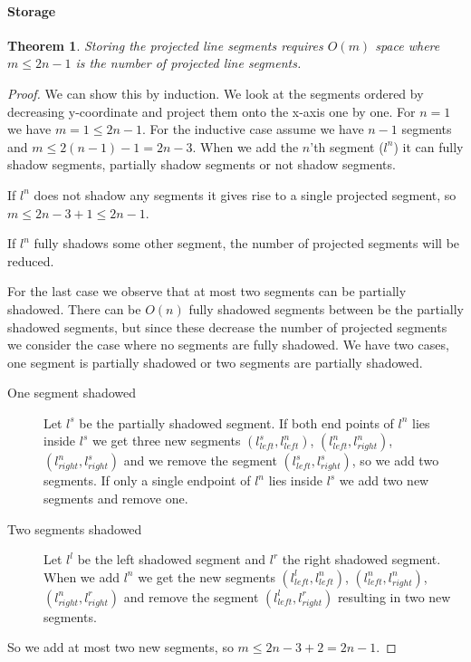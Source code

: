 \documentclass[10pt,a4paper,final,oneside,openany,article,oldfontcommands]{memoir}
\newtheorem{rayshooting}{Theorem}
\begin{document}
\paragraph{Storage}
\begin{rayshooting}
  Storing the projected line segments requires $O(m)$ space where $m \le 2n-1$ is the number of projected line segments.
\end{rayshooting}
\begin{proof}
We can show this by induction. We look at the segments ordered by decreasing y-coordinate and project them onto the x-axis one by one. For $n = 1$ we have $m = 1 \le 2n -1$. For the inductive case assume we have $n-1$ segments and $m \le 2(n-1) - 1 = 2n - 3$. When we add the $n$'th segment ($l^n$) it can fully shadow segments, partially shadow segments or not shadow segments.

If $l^n$ does not shadow any segments it gives rise to a single projected segment, so $m \le 2n - 3 + 1 \le 2n - 1$.

If $l^n$ fully shadows some other segment, the number of projected segments will be reduced.

For the last case we observe that at most two segments can be partially shadowed. There can be $O(n)$ fully shadowed segments between be the partially shadowed segments, but since these decrease the number of projected segments we consider the case where no segments are fully shadowed. We have two cases, one segment is partially shadowed or two segments are partially shadowed. 

\begin{description}
\item[One segment shadowed] Let $l^s$ be the partially shadowed segment. If both end points of $l^n$ lies inside $l^s$ we get three new segments $(l^s_{left},l^n_{left})$, $(l^n_{left}, l^n_{right})$, $(l^n_{right}, l^s_{right})$ and we remove the segment $(l^s_{left}, l^s_{right})$, so we add two segments. If only a single endpoint of $l^n$ lies inside $l^s$ we add two new segments and remove one.
\item[Two segments shadowed] Let $l^l$ be the left shadowed segment and $l^r$ the right shadowed segment. When we add $l^n$ we get the new segments $(l^l_{left},l^n_{left})$, $(l^n_{left}, l^n_{right})$, $(l^n_{right}, l^r_{right})$ and remove the segment $(l^l_{left}, l^r_{right})$ resulting in two new segments.
\end{description}
So we add at most two new segments, so $m \le 2n - 3 + 2 = 2n -1$.
\end{proof}
\end{document}
